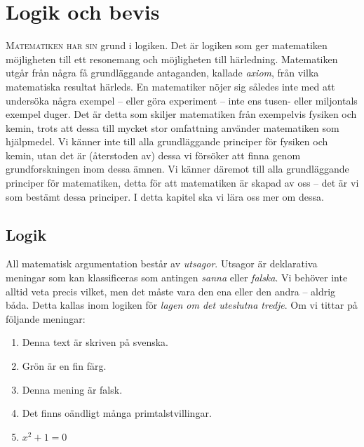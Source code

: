 \chapter{Logik och bevis}
\label{ch:Logik}
\lettrine{M}{atematiken har sin} grund i logiken.
Det är logiken som ger matematiken möjligheten till ett resonemang och
möjligheten till härledning.
Matematiken utgår från några få grundläggande antaganden, kallade \emph{axiom},
från vilka matematiska resultat härleds.
En matematiker nöjer sig således inte med att undersöka några exempel -- eller
göra experiment -- inte ens tusen- eller miljontals exempel duger.
Det är detta som skiljer matematiken från exempelvis fysiken och kemin, trots
att dessa till mycket stor omfattning använder matematiken som hjälpmedel.
Vi känner inte till alla grundläggande principer för fysiken och kemin, utan 
det är (återstoden av) dessa vi försöker att finna genom grundforskningen inom 
dessa ämnen.
Vi känner däremot till alla grundläggande principer för matematiken, detta för
att matematiken är skapad av oss -- det är vi som bestämt dessa principer.
I detta kapitel ska vi lära oss mer om dessa.


\section{Logik}

All matematisk argumentation består av \emph{utsagor}.
Utsagor är deklarativa meningar som kan klassificeras som 
antingen \emph{sanna} eller \emph{falska}.
Vi behöver inte alltid veta precis vilket, men det måste vara den ena eller den
andra -- aldrig båda.
Detta kallas inom logiken för \emph{lagen om det uteslutna tredje}.
Om vi tittar på följande meningar:
\begin{enumerate}
  \item Denna text är skriven på svenska.
  \item Grön är en fin färg.
  \item Denna mening är falsk.
  \item Det finns oändligt många primtalstvillingar.
  \item \(x^2+1=0\)
\end{enumerate}

